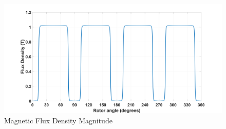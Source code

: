 \documentclass{article}
\begin{document}
\begin{figure}[h!]
\centering
\includegraphics[scale=0.15]{Figures/MagB.png}
\caption{Magnetic Flux Density Magnitude }
\label{fig:FluxPath}
\end{figure}






\end{document}
